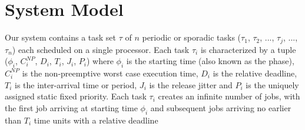 \section{System Model}\label{sec:system_model}

Our system contains a task set \begin{math}\tau\end{math} of $n$ periodic or sporadic tasks (\begin{math}\tau_{1}\end{math}, \begin{math}\tau_{2}\end{math}, ..., \begin{math}\tau_{j}\end{math}, ..., \begin{math}\tau_{n}\end{math}) each scheduled on a single processor.  Each task \begin{math}\tau_{i}\end{math} is characterized by a tuple (\begin{math}\phi_{i}\end{math}, \begin{math}C_{i}^{NP}\end{math}, \begin{math}D_{i}\end{math}, \begin{math}T_{i}\end{math}, \begin{math}J_{i}\end{math}, \begin{math}P_{i}\end{math}) where \begin{math}\phi_{i}\end{math} is the starting time (also known as the phase), \begin{math}C_{i}^{NP}\end{math} is the non-preemptive worst case execution time, \begin{math}D_{i}\end{math} is the relative deadline, \begin{math}T_{i}\end{math} is the inter-arrival time or period, \begin{math}J_{i}\end{math} is the release jitter and \begin{math}P_{i}\end{math} is the uniquely assigned static fixed priority.  Each task \begin{math}\tau_{i}\end{math} creates an infinite number of jobs, with the first job arriving at starting time \begin{math}\phi_{i}\end{math} and subsequent jobs arriving no earlier than \begin{math}T_{i}\end{math} time units with a relative deadline 